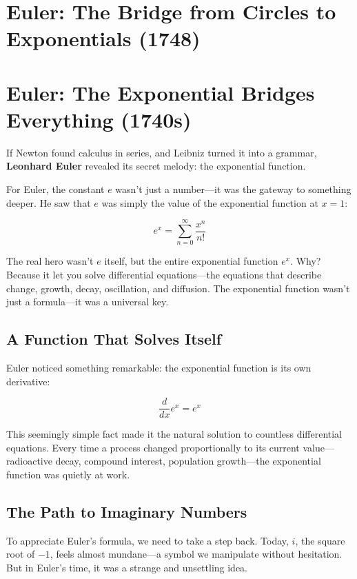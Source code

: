 \section{Euler: The Bridge from Circles to Exponentials (1748)}


\section{Euler: The Exponential Bridges Everything (1740s)}

If Newton found calculus in series, and Leibniz turned it into a grammar, \textbf{Leonhard Euler} revealed its secret melody: the exponential function.

For Euler, the constant \( e \) wasn’t just a number—it was the gateway to something deeper. He saw that \( e \) was simply the value of the exponential function at \( x = 1 \):

\[
e^x = \sum_{n=0}^{\infty} \frac{x^n}{n!}
\]

The real hero wasn’t \( e \) itself, but the entire exponential function \( e^x \). Why? Because it let you solve differential equations—the equations that describe change, growth, decay, oscillation, and diffusion. The exponential function wasn’t just a formula—it was a universal key.

\vspace{1em}

\subsection{A Function That Solves Itself}

Euler noticed something remarkable: the exponential function is its own derivative:

\[
\frac{d}{dx} e^x = e^x
\]

This seemingly simple fact made it the natural solution to countless differential equations. Every time a process changed proportionally to its current value—radioactive decay, compound interest, population growth—the exponential function was quietly at work.

\vspace{1em}

\subsection{The Path to Imaginary Numbers}

To appreciate Euler’s formula, we need to take a step back. Today, \( i \), the square root of \(-1\), feels almost mundane—a symbol we manipulate without hesitation. But in Euler’s time, it was a strange and unsettling idea.

